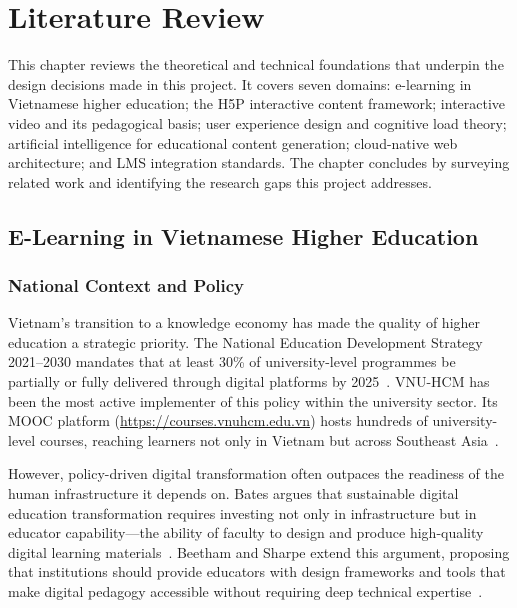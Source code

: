 \chapter{Literature Review}

This chapter reviews the theoretical and technical foundations that underpin
the design decisions made in this project. It covers seven domains:
e-learning in Vietnamese higher education; the H5P interactive content
framework; interactive video and its pedagogical basis; user experience
design and cognitive load theory; artificial intelligence for educational
content generation; cloud-native web architecture; and LMS integration
standards. The chapter concludes by surveying related work and identifying
the research gaps this project addresses.

\section{E-Learning in Vietnamese Higher Education}

\subsection{National Context and Policy}

Vietnam's transition to a knowledge economy has made the quality of higher
education a strategic priority. The National Education Development Strategy
2021--2030 mandates that at least 30\% of university-level programmes be
partially or fully delivered through digital platforms by
2025~\cite{vietnam_strategy2021}. VNU-HCM has been the most active
implementer of this policy within the university sector. Its MOOC platform
(\url{https://courses.vnuhcm.edu.vn}) hosts hundreds of university-level
courses, reaching learners not only in Vietnam but across
Southeast Asia~\cite{vnuhcm_mooc}.

However, policy-driven digital transformation often outpaces the readiness
of the human infrastructure it depends on. Bates argues that sustainable
digital education transformation requires investing not only in
infrastructure but in educator capability---the ability of faculty to design
and produce high-quality digital learning materials~\cite{bates2019}.
Beetham and Sharpe extend this argument, proposing that institutions should
provide educators with design frameworks and tools that make digital pedagogy
accessible without requiring deep technical expertise~\cite{beetham2019}.

